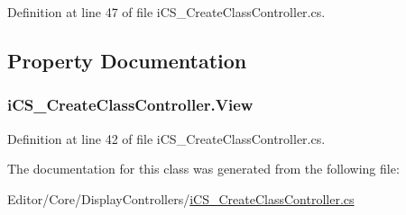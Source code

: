 Definition at line 47 of file i\+C\+S\+\_\+\+Create\+Class\+Controller.\+cs.



\subsection{Property Documentation}
\hypertarget{classi_c_s___create_class_controller_a8654f948044a0e8cf2d3ab7c4765e897}{
\subsubsection[{View}]{ i\+C\+S\+\_\+\+Create\+Class\+Controller.\+View\hspace{0.3cm}{\ttfamily [get]}}}\label{classi_c_s___create_class_controller_a8654f948044a0e8cf2d3ab7c4765e897}


Definition at line 42 of file i\+C\+S\+\_\+\+Create\+Class\+Controller.\+cs.



The documentation for this class was generated from the following file\+:\begin{DoxyCompactItemize}
\item 
Editor/\+Core/\+Display\+Controllers/\hyperlink{i_c_s___create_class_controller_8cs}{i\+C\+S\+\_\+\+Create\+Class\+Controller.\+cs}\end{DoxyCompactItemize}
